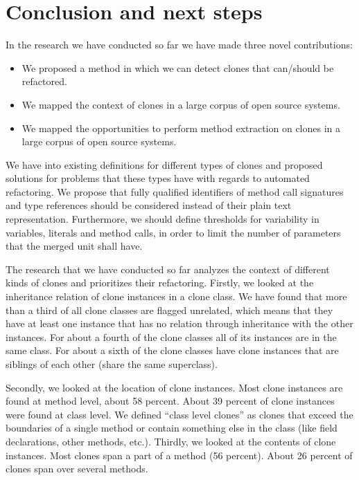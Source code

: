 \documentclass[a4paper]{article}
\begin{document}
\section{Conclusion and next steps}\label{chap:conclusion}
In the research we have conducted so far we have made three novel contributions:
\begin{itemize}
    \item We proposed a method in which we can detect clones that can/should be refactored.
    \item We mapped the context of clones in a large corpus of open source systems.
    \item We mapped the opportunities to perform method extraction on clones in a large corpus of open source systems.
\end{itemize}

We have into existing definitions for different types of clones \cite{roy2007survey} and proposed solutions for problems that these types have with regards to automated refactoring. We propose that fully qualified identifiers of method call signatures and type references should be considered instead of their plain text representation. Furthermore, we should define thresholds for variability in variables, literals and method calls, in order to limit the number of parameters that the merged unit shall have.

The research that we have conducted so far analyzes the context of different kinds of clones and prioritizes their refactoring. Firstly, we looked at the inheritance relation of clone instances in a clone class. We have found that more than a third of all clone classes are flagged unrelated, which means that they have at least one instance that has no relation through inheritance with the other instances. For about a fourth of the clone classes all of its instances are in the same class. For about a sixth of the clone classes have clone instances that are siblings of each other (share the same superclass).

Secondly, we looked at the location of clone instances. Most clone instances are found at method level, about 58 percent. About 39 percent of clone instances were found at class level. We defined ``class level clones'' as clones that exceed the boundaries of a single method or contain something else in the class (like field declarations, other methods, etc.). Thirdly, we looked at the contents of clone instances. Most clones span a part of a method (56 percent). About 26 percent of clones span over several methods.
\end{document}
